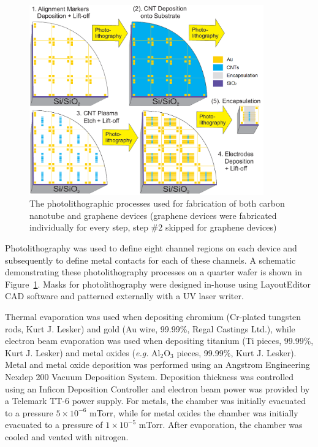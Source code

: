\documentclass[
  a4paper,
]{scrbook}
\begin{document}
\begin{figure}

{\centering \includegraphics[width=0.9\textwidth,height=\textheight]{./figures/ch4/photolithography-cycle.png}

}

\caption{\label{fig-qw-photolithography}The photolithographic processes
used for fabrication of both carbon nanotube and graphene devices
(graphene devices were fabricated individually for every step, step \#2
skipped for graphene devices)}

\end{figure}

Photolithography was used to define eight channel regions on each device
and subsequently to define metal contacts for each of these channels. A
schematic demonstrating these photolithography processes on a quarter
wafer is shown in Figure~\ref{fig-qw-photolithography}. Masks for
photolithography were designed in-house using LayoutEditor CAD software
and patterned externally with a UV laser writer.

Thermal evaporation was used when depositing chromium (Cr-plated
tungsten rods, Kurt J. Lesker) and gold (Au wire, 99.99\%, Regal
Castings Ltd.), while electron beam evaporation was used when depositing
titanium (Ti pieces, 99.99\%, Kurt J. Lesker) and metal oxides
(\emph{e.g.} Al\(_2\)O\(_3\) pieces, 99.99\%, Kurt J. Lesker). Metal and
metal oxide deposition was performed using an Angstrom Engineering
Nexdep 200 Vacuum Deposition System. Deposition thickness was controlled
using an Inficon Deposition Controller and electron beam power was
provided by a Telemark TT-6 power supply. For metals, the chamber was
initially evacuated to a pressure \(5 \times 10^{-6}\) mTorr, while for
metal oxides the chamber was initially evacuated to a pressure of
\(1 \times 10^{-5}\) mTorr. After evaporation, the chamber was cooled
and vented with nitrogen.
\end{document}
